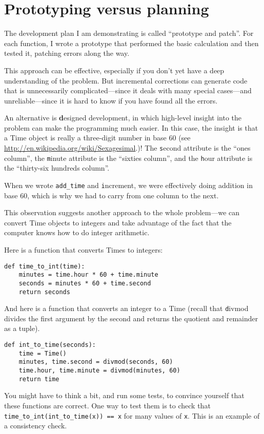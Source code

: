 \documentclass[
DIV=11,
fontsize=12,
twoside,
headinclude=false,
titlepage=firstiscover,
abstract=true,
headsepline=true,
footsepline=true,
chapterprefix=true, %
headings=big,
bibliography=totoc,%
captions=tableheading
]{scrbook}
\theoremstyle{definition}
\begin{document}
\section{Prototyping versus planning}
\label{prototype}

The development plan I am demonstrating is called ``prototype and
patch''.  For each function, I wrote a prototype that performed the
basic calculation and then tested it, patching errors along the
way.

This approach can be effective, especially if you don't yet have a
deep understanding of the problem.  But incremental corrections can
generate code that is unnecessarily complicated---since it deals with
many special cases---and unreliable---since it is hard to know if you
have found all the errors.

An alternative is {\textbf designed development}, in which high-level
insight into the problem can make the programming much easier.  In
this case, the insight is that a Time object is really a three-digit
number in base 60 (see \url{http://en.wikipedia.org/wiki/Sexagesimal}.)!  The
{\texttt second} attribute is the ``ones column'', the {\texttt minute}
attribute is the ``sixties column'', and the {\texttt hour} attribute is
the ``thirty-six hundreds column''.

When we wrote \verb"add_time" and {\texttt increment}, we were effectively
doing addition in base 60, which is why we had to carry from one
column to the next.

This observation suggests another approach to the whole problem---we
can convert Time objects to integers and take advantage of the fact
that the computer knows how to do integer arithmetic.  

Here is a function that converts Times to integers:

\begin{lstlisting}
def time_to_int(time):
    minutes = time.hour * 60 + time.minute
    seconds = minutes * 60 + time.second
    return seconds
\end{lstlisting}
%
And here is a function that converts an integer to a Time
(recall that {\texttt divmod} divides the first argument by the second
and returns the quotient and remainder as a tuple).

\begin{lstlisting}
def int_to_time(seconds):
    time = Time()
    minutes, time.second = divmod(seconds, 60)
    time.hour, time.minute = divmod(minutes, 60)
    return time
\end{lstlisting}
%
You might have to think a bit, and run some tests, to convince
yourself that these functions are correct.  One way to test them is to
check that \verb"time_to_int(int_to_time(x)) == x" for many values of
{\texttt x}.  This is an example of a consistency check.
\end{document}
